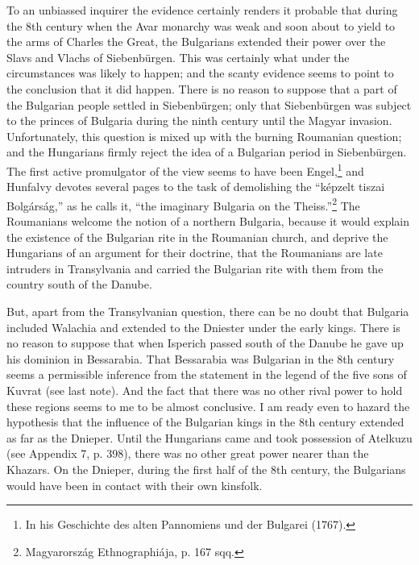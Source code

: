 To an unbiassed inquirer the evidence certainly renders it probable that during the 8th century when the Avar monarchy was weak and soon about to yield to the arms of Charles the Great, the Bulgarians extended their power over the Slavs and Vlachs of Siebenbürgen. This was certainly what under the circumstances was likely to happen; and the scanty evidence seems to point to the conclusion that it did happen. There is no reason to suppose that a part of the Bulgarian people settled in Siebenbürgen; only that Siebenbürgen was subject to the princes of Bulgaria during the ninth century until the Magyar invasion. Unfortunately, this question is mixed up with the burning Roumanian question; and the Hungarians firmly reject the idea of a Bulgarian period in Siebenbürgen. The first active promulgator of the view seems to have been Engel,\footnote{In his Geschichte des alten Pannomiens und der Bulgarei (1767).} and Hunfalvy devotes several pages to the task of demolishing the \texthebrew{“}képzelt tiszai Bolgárság,\texthebrew{}” as he calls it, \texthebrew{“}the imaginary Bulgaria on the Theiss.\texthebrew{}”\footnote{Magyarország Ethnographiája, p. 167 sqq.} The Roumanians welcome the notion of a northern Bulgaria, because it would explain the existence of the Bulgarian rite in the Roumanian church, and deprive the Hungarians of an argument for their doctrine, that the Roumanians are late intruders in Transylvania and carried the Bulgarian rite with them from the country south of the Danube.

But, apart from the Transylvanian question, there can be no doubt that Bulgaria included Walachia and extended to the Dniester under the early kings. There is no reason to suppose that when Isperich passed south of the Danube he gave up his dominion in Bessarabia. That Bessarabia was Bulgarian in the 8th century seems a permissible inference from the statement in the legend of the five sons of Kuvrat (see last note). And the fact that there was no other rival power to hold these regions seems to me to be almost conclusive. I am ready even to hazard the hypothesis that the influence of the Bulgarian kings in the 8th century extended as far as the Dnieper. Until the Hungarians came and took possession of Atelkuzu (see Appendix 7, p. 398), there was no other great power nearer than the Khazars. On the Dnieper, during the first half of the 8th century, the Bulgarians would have been in contact with their own kinsfolk.


